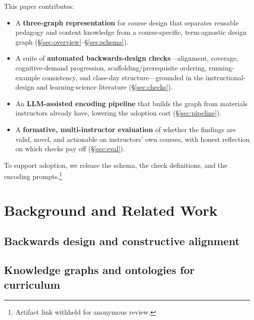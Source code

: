 \documentclass[sigconf,review]{acmart}
\begin{document}
This paper contributes:
\begin{itemize}
  \item A \textbf{three-graph representation} for course design that separates
    reusable pedagogy and content knowledge from a course-specific,
    term-agnostic design graph (\S\ref{sec:overview}--\S\ref{sec:schema}).
  \item A suite of \textbf{automated backwards-design checks}---alignment,
    coverage, cognitive-demand progression, scaffolding/prerequisite ordering,
    running-example consistency, and class-day structure---grounded in the
    instructional-design and learning-science literature
    (\S\ref{sec:checks}).
  \item An \textbf{LLM-assisted encoding pipeline} that builds the graph from
    materials instructors already have, lowering the adoption cost
    (\S\ref{sec:pipeline}).
  \item A \textbf{formative, multi-instructor evaluation} of whether the
    findings are valid, novel, and actionable on instructors' own courses, with
    honest reflection on which checks pay off (\S\ref{sec:eval}).
\end{itemize}

To support adoption, we release the schema, the check definitions, and the
encoding prompts.\footnote{Artifact link withheld for anonymous review.}

\section{Background and Related Work}
\label{sec:related}

\subsection{Backwards design and constructive alignment}

\subsection{Knowledge graphs and ontologies for curriculum}
\end{document}
